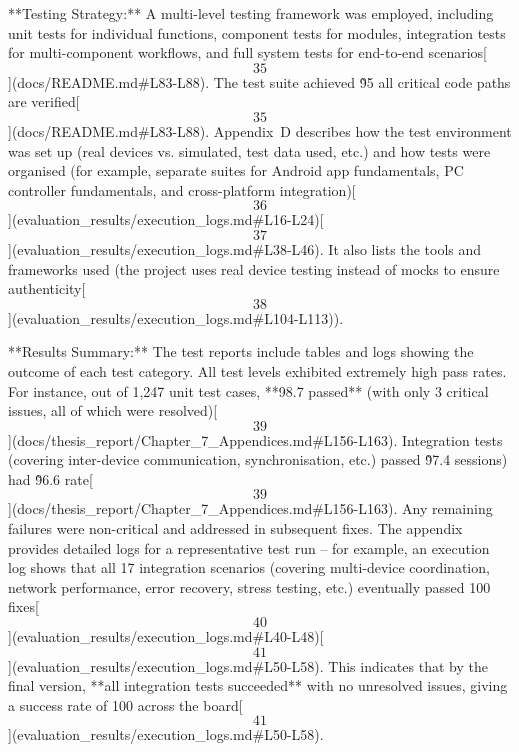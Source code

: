 \documentclass[12pt,a4paper]{article}
\begin{document}
{**Testing Strategy:** A multi-level testing framework was employed,
including unit tests for individual functions, component tests for
modules, integration tests for multi-component workflows, and full
system tests for end-to-end
scenarios[\[35\]](docs/README.md#L83-L88).
The test suite achieved \~95%
all critical code paths are
verified[\[35\]](docs/README.md#L83-L88).
Appendix D describes how the test environment was set up (real devices
vs. simulated, test data used, etc.) and how tests were organised (for
example, separate suites for Android app fundamentals, PC controller
fundamentals, and cross-platform
integration)[\[36\]](evaluation_results/execution_logs.md#L16-L24)[\[37\]](evaluation_results/execution_logs.md#L38-L46).
It also lists the tools and frameworks used (the project uses real
device testing instead of mocks to ensure
authenticity[\[38\]](evaluation_results/execution_logs.md#L104-L113)).

**Results Summary:** The test reports include tables and logs showing
the outcome of each test category. All test levels exhibited extremely
high pass rates. For instance, out of 1,247 unit test cases, **98.7%
passed** (with only 3 critical issues, all of which were
resolved)[\[39\]](docs/thesis_report/Chapter_7_Appendices.md#L156-L163).
Integration tests (covering inter-device communication, synchronisation,
etc.) passed \~97.4%
sessions) had \~96.6%
rate[\[39\]](docs/thesis_report/Chapter_7_Appendices.md#L156-L163).
Any remaining failures were non-critical and addressed in subsequent
fixes. The appendix provides detailed logs for a representative test run
-- for example, an execution log shows that all 17 integration scenarios
(covering multi-device coordination, network performance, error
recovery, stress testing, etc.) eventually passed 100%
fixes[\[40\]](evaluation_results/execution_logs.md#L40-L48)[\[41\]](evaluation_results/execution_logs.md#L50-L58).
This indicates that by the final version, **all integration tests
succeeded** with no unresolved issues, giving a success rate of 100%
across the
board[\[41\]](evaluation_results/execution_logs.md#L50-L58).

}
\end{document}
